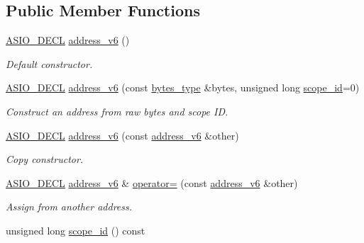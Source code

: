 \subsection*{Public Member Functions}
\begin{DoxyCompactItemize}
\item 
\hyperlink{config_8hpp_ab54d01ea04afeb9a8b39cfac467656b7}{A\+S\+I\+O\+\_\+\+D\+E\+C\+L} \hyperlink{classasio_1_1ip_1_1address__v6_af96a3d69983966b78d966cd8704289e3}{address\+\_\+v6} ()
\begin{DoxyCompactList}\small\item\em Default constructor. \end{DoxyCompactList}\item 
\hyperlink{config_8hpp_ab54d01ea04afeb9a8b39cfac467656b7}{A\+S\+I\+O\+\_\+\+D\+E\+C\+L} \hyperlink{classasio_1_1ip_1_1address__v6_add49510a1a03329e08a8efb59aceb721}{address\+\_\+v6} (const \hyperlink{classasio_1_1ip_1_1address__v6_a8a3e5d2312af4134087ad3ebdaad7881}{bytes\+\_\+type} \&bytes, unsigned long \hyperlink{classasio_1_1ip_1_1address__v6_a04157f659b190f74732c6437b0fd20b7}{scope\+\_\+id}=0)
\begin{DoxyCompactList}\small\item\em Construct an address from raw bytes and scope I\+D. \end{DoxyCompactList}\item 
\hyperlink{config_8hpp_ab54d01ea04afeb9a8b39cfac467656b7}{A\+S\+I\+O\+\_\+\+D\+E\+C\+L} \hyperlink{classasio_1_1ip_1_1address__v6_a8bac642d7879b6f396843216ddd6dfd3}{address\+\_\+v6} (const \hyperlink{classasio_1_1ip_1_1address__v6}{address\+\_\+v6} \&other)
\begin{DoxyCompactList}\small\item\em Copy constructor. \end{DoxyCompactList}\item 
\hyperlink{config_8hpp_ab54d01ea04afeb9a8b39cfac467656b7}{A\+S\+I\+O\+\_\+\+D\+E\+C\+L} \hyperlink{classasio_1_1ip_1_1address__v6}{address\+\_\+v6} \& \hyperlink{classasio_1_1ip_1_1address__v6_aea98a1e110197aa0652aa86a232a912e}{operator=} (const \hyperlink{classasio_1_1ip_1_1address__v6}{address\+\_\+v6} \&other)
\begin{DoxyCompactList}\small\item\em Assign from another address. \end{DoxyCompactList}\item 
unsigned long \hyperlink{classasio_1_1ip_1_1address__v6_a04157f659b190f74732c6437b0fd20b7}{scope\+\_\+id} () const 

\end{DoxyCompactItemize}
